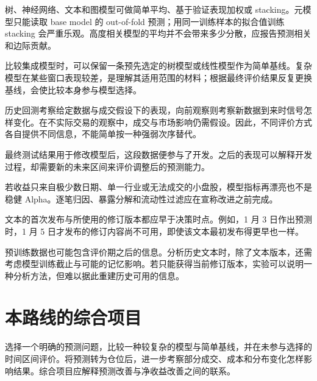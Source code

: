 树、神经网络、文本和图模型可做简单平均、基于验证表现加权或 stacking。元模型只能读取 base model 的 out-of-fold 预测；用同一训练样本的拟合值训练 stacking 会严重乐观。高度相关模型的平均并不会带来多少分散，应报告预测相关和边际贡献。

比较集成模型时，可以保留一条预先选定的树模型或线性模型作为简单基线。复杂模型在某些窗口表现较差，是理解其适用范围的材料；根据最终评价结果反复更换基线，会使比较本身参与模型选择。


历史回测考察给定数据与成交假设下的表现，向前观察则考察新数据到来时信号怎样变化。在不实际交易的观察中，成交与市场影响仍需假设。因此，不同评价方式各自提供不同信息，不能简单按一种强弱次序替代。

最终测试结果用于修改模型后，这段数据便参与了开发。之后的表现可以解释开发过程，却需要新的未来区间来评价调整后的预测能力。

\begin{diagnostic}
若收益只来自极少数日期、单一行业或无法成交的小盘股，模型指标再漂亮也不是稳健 Alpha。逐笔归因、暴露分解和流动性过滤应在宣称改进之前完成。
\end{diagnostic}


文本的首次发布与所使用的修订版本都应早于决策时点。例如，1 月 3 日作出预测时，1 月 5 日才发布的修订内容尚不可用，即使该文本最初发布得更早也一样。

预训练数据也可能包含评价期之后的信息。分析历史文本时，除了文本版本，还需考虑模型训练截止与可能的记忆影响。若只能获得当前修订版本，实验可以说明一种分析方法，但难以据此重建历史可用的信息。

\section{本路线的综合项目}

选择一个明确的预测问题，比较一种较复杂的模型与简单基线，并在未参与选择的时间区间评价。将预测转为仓位后，进一步考察部分成交、成本和分布变化怎样影响结果。综合项目应解释预测改善与净收益改善之间的联系。



